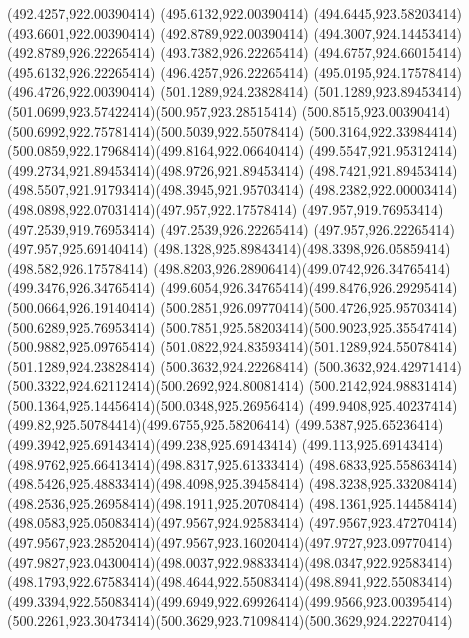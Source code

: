 {{	\lineto(492.4257,922.00390414)
	\closepath
	\moveto(495.6132,922.00390414)
	\lineto(494.6445,923.58203414)
	\lineto(493.6601,922.00390414)
	\lineto(492.8789,922.00390414)
	\lineto(494.3007,924.14453414)
	\lineto(492.8789,926.22265414)
	\lineto(493.7382,926.22265414)
	\lineto(494.6757,924.66015414)
	\lineto(495.6132,926.22265414)
	\lineto(496.4257,926.22265414)
	\lineto(495.0195,924.17578414)
	\lineto(496.4726,922.00390414)
	\closepath
	\moveto(501.1289,924.23828414)
	\curveto(501.1289,923.89453414)(501.0699,923.57422414)(500.957,923.28515414)
	\curveto(500.8515,923.00390414)(500.6992,922.75781414)(500.5039,922.55078414)
	\curveto(500.3164,922.33984414)(500.0859,922.17968414)(499.8164,922.06640414)
	\curveto(499.5547,921.95312414)(499.2734,921.89453414)(498.9726,921.89453414)
	\curveto(498.7421,921.89453414)(498.5507,921.91793414)(498.3945,921.95703414)
	\curveto(498.2382,922.00003414)(498.0898,922.07031414)(497.957,922.17578414)
	\lineto(497.957,919.76953414)
	\lineto(497.2539,919.76953414)
	\lineto(497.2539,926.22265414)
	\lineto(497.957,926.22265414)
	\lineto(497.957,925.69140414)
	\curveto(498.1328,925.89843414)(498.3398,926.05859414)(498.582,926.17578414)
	\curveto(498.8203,926.28906414)(499.0742,926.34765414)(499.3476,926.34765414)
	\curveto(499.6054,926.34765414)(499.8476,926.29295414)(500.0664,926.19140414)
	\curveto(500.2851,926.09770414)(500.4726,925.95703414)(500.6289,925.76953414)
	\curveto(500.7851,925.58203414)(500.9023,925.35547414)(500.9882,925.09765414)
	\curveto(501.0822,924.83593414)(501.1289,924.55078414)(501.1289,924.23828414)
	\closepath
	\moveto(500.3632,924.22268414)
	\curveto(500.3632,924.42971414)(500.3322,924.62112414)(500.2692,924.80081414)
	\curveto(500.2142,924.98831414)(500.1364,925.14456414)(500.0348,925.26956414)
	\curveto(499.9408,925.40237414)(499.82,925.50784414)(499.6755,925.58206414)
	\curveto(499.5387,925.65236414)(499.3942,925.69143414)(499.238,925.69143414)
	\curveto(499.113,925.69143414)(498.9762,925.66413414)(498.8317,925.61333414)
	\curveto(498.6833,925.55863414)(498.5426,925.48833414)(498.4098,925.39458414)
	\curveto(498.3238,925.33208414)(498.2536,925.26958414)(498.1911,925.20708414)
	\curveto(498.1361,925.14458414)(498.0583,925.05083414)(497.9567,924.92583414)
	\lineto(497.9567,923.47270414)
	\curveto(497.9567,923.28520414)(497.9567,923.16020414)(497.9727,923.09770414)
	\curveto(497.9827,923.04300414)(498.0037,922.98833414)(498.0347,922.92583414)
	\curveto(498.1793,922.67583414)(498.4644,922.55083414)(498.8941,922.55083414)
	\curveto(499.3394,922.55083414)(499.6949,922.69926414)(499.9566,923.00395414)
	\curveto(500.2261,923.30473414)(500.3629,923.71098414)(500.3629,924.22270414)
}}

